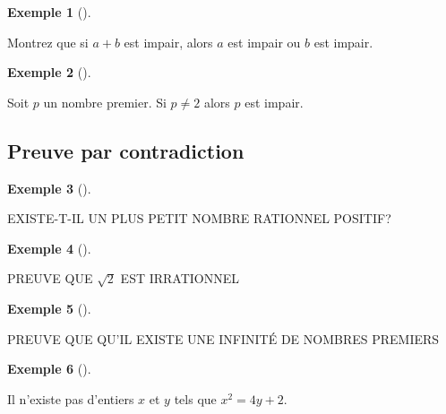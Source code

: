 \documentclass[
  letterpaper,
]{scrbook}
\theoremstyle{plain}
\theoremstyle{definition}
\newtheorem{example}{Exemple}[chapter]
\theoremstyle{definition}
\theoremstyle{remark}
\begin{document}
\leavevmode{}%
\begin{example}[]\label{exm-aplusb-impair-a-b-impair}

Montrez que si \(a+b\) est impair, alors \(a\) est impair ou \(b\) est
impair.

\end{example}

\leavevmode{}%
\begin{example}[]\label{exm-nombre-premier-impair}

Soit \(p\) un nombre premier. Si \(p\neq 2\) alors \(p\) est impair.

\end{example}

\hypertarget{preuve-par-contradiction}{%
\subsection{Preuve par contradiction}\label{preuve-par-contradiction}}

\leavevmode{}%
\begin{example}[]\label{exm-plus-petit-nombre-rationnel}

EXISTE-T-IL UN PLUS PETIT NOMBRE RATIONNEL POSITIF?

\end{example}

\leavevmode{}%
\begin{example}[]\label{exm-sqrt2-irrationnel}

PREUVE QUE \(\sqrt{2}\) EST IRRATIONNEL

\end{example}

\leavevmode{}%
\begin{example}[]\label{exm-infinite-nombres-premiers}

PREUVE QUE QU'IL EXISTE UNE INFINITÉ DE NOMBRES PREMIERS

\end{example}

\leavevmode{}%
\begin{example}[]\label{exm-pas-entiers-equation}

Il n'existe pas d'entiers \(x\) et \(y\) tels que \(x^2=4y+2\).

\end{example}
\end{document}
